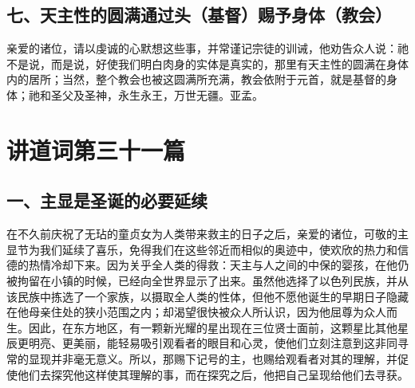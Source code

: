 
\subsection{七、天主性的圆满通过头（基督）赐予身体（教会）}

亲爱的诸位，请以虔诚的心默想这些事，并常谨记宗徒的训诫，他劝告众人说：祂不是说，而是说，好使我们明白肉身的实体是真实的，那里有天主性的圆满在身体内的居所；当然，整个教会也被这圆满所充满，教会依附于元首，就是基督的身体；祂和圣父及圣神，永生永王，万世无疆。亚孟。\par



\section{讲道词第三十一篇}

\par


\subsection{一、主显是圣诞的必要延续}

在不久前庆祝了无玷的童贞女为人类带来救主的日子之后，亲爱的诸位，可敬的主显节为我们延续了喜乐，免得我们在这些邻近而相似的奥迹中，使欢欣的热力和信德的热情冷却下来。因为关乎全人类的得救：天主与人之间的中保的婴孩，在他仍被拘留在小镇的时候，已经向全世界显示了出来。虽然他选择了以色列民族，并从该民族中拣选了一个家族，以摄取全人类的性体，但他不愿他诞生的早期日子隐藏在他母亲住处的狭小范围之内；却渴望很快被众人所认识，因为他屈尊为众人而生。因此，在东方地区，有一颗新光耀的星出现在三位贤士面前，这颗星比其他星辰更明亮、更美丽，能轻易吸引观看者的眼目和心灵，使他们立刻注意到这非同寻常的显现并非毫无意义。所以，那赐下记号的主，也赐给观看者对其的理解，并促使他们去探究他这样使其理解的事，而在探究之后，他把自己呈现给他们去寻获。\par

